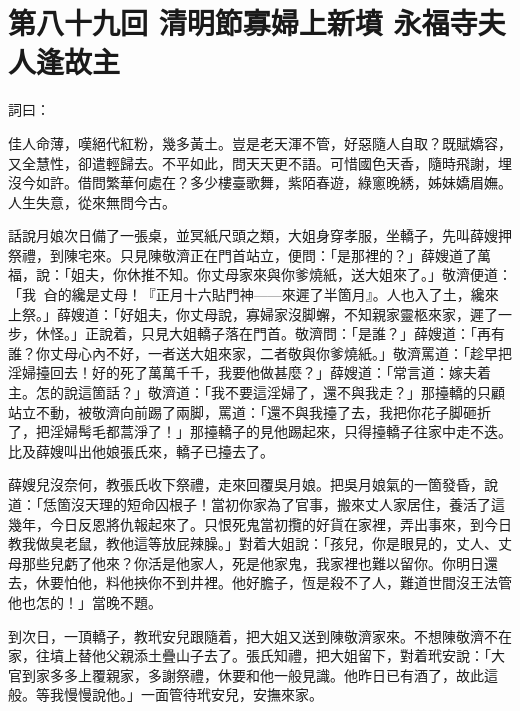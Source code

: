 
\chapter*{第八十九回 清明節寡婦上新墳 永福寺夫人逢故主}


詞曰：

\begin{myquote}
佳人命薄，嘆絕代紅粉，幾多黃土。豈是老天渾不管，好惡隨人自取？既賦嬌容，又全慧性，卻遣輕歸去。不平如此，問天天更不語。可惜國色天香，隨時飛謝，埋沒今如許。借問繁華何處在？多少樓臺歌舞，紫陌春遊，綠窻晚綉，姊妹嬌眉嫵。人生失意，從來無問今古。

\end{myquote}

話說月娘次日備了一張桌，並冥紙尺頭之類，大姐身穿孝服，坐轎子，先叫薛嫂押祭禮，到陳宅來。只見陳敬濟正在門首站立，便問：「是那裡的？」薛嫂道了萬福，說：「姐夫，你休推不知。你丈母家來與你爹燒紙，送大姐來了。」{}敬濟便道：「我𩫻𩫵㒲的纔是丈母！{}『正月十六貼門神——來遲了半箇月』。人也入了土，纔來上祭。」薛嫂道：「好姐夫，你丈母說，寡婦家沒脚蠏，不知親家靈柩來家，遲了一步，休怪。」正說着，只見大姐轎子落在門首。敬濟問：「是誰？」薛嫂道：「再有誰？你丈母心內不好，一者送大姐來家，二者敬與你爹燒紙。」敬濟罵道：「趁早把淫婦擡回去！好的死了萬萬千千，我要他做甚麼？」{}薛嫂道：「常言道：嫁夫着主。怎的說這箇話？」敬濟道：「我不要這淫婦了，還不與我走？」那擡轎的只顧站立不動，被敬濟向前踢了兩脚，罵道：「還不與我擡了去，我把你花子脚砸折了，把淫婦髩毛都蒿淨了！」那擡轎子的見他踢起來，只得擡轎子往家中走不迭。比及薛嫂叫出他娘張氏來，轎子已擡去了。

薛嫂兒沒奈何，教張氏收下祭禮，走來回覆吳月娘。把吳月娘氣的一箇發昏，說道：「恁箇沒天理的短命囚根子！當初你家為了官事，搬來丈人家居住，養活了這幾年，今日反恩將仇報起來了。只恨死鬼當初攬的好貨在家裡，弄出事來，到今日教我做臭老鼠，教他這等放屁辣臊。」{}對着大姐說：「孩兒，你是眼見的，丈人、丈母那些兒虧了他來？你活是他家人，死是他家鬼，我家裡也難以留你。你明日還去，休要怕他，料他挾你不到井裡。他好膽子，恆是殺不了人，{}難道世間沒王法管他也怎的！」當晚不題。

到次日，一頂轎子，教玳安兒跟隨着，把大姐又送到陳敬濟家來。不想陳敬濟不在家，往墳上替他父親添土疊山子去了。張氏知禮，把大姐留下，對着玳安說：「大官到家多多上覆親家，多謝祭禮，休要和他一般見識。他昨日已有酒了，故此這般。等我慢慢說他。」一面管待玳安兒，安撫來家。

